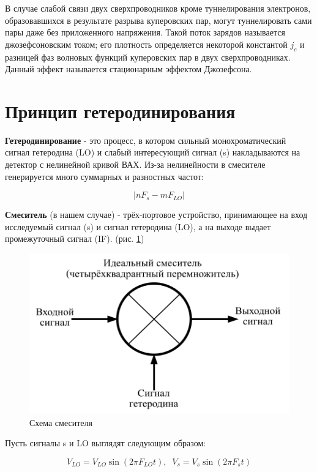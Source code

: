 \documentclass[12pt,a4paper]{article}
\begin{document}
В случае слабой связи двух сверхпроводников кроме туннелирования
электронов, образовавшихся в результате разрыва куперовских пар, могут
туннелировать сами пары даже без приложенного напряжения. Такой поток зарядов
называется джозефсоновским током; его плотность определяется некоторой
константой $j_c$ и разницей фаз волновых функций куперовских пар в двух
сверхпроводниках. Данный эффект называется стационарным эффектом Джозефсона.

\newpage

\section{Принцип гетеродинирования}

\textbf{Гетеродинирование} - это процесс, в котором сильный монохроматический сигнал гетеродина (LO) и слабый интересующий сигнал (s) накладываются на детектор с нелинейной кривой ВАХ. Из-за нелинейности в смесителе генерируется много суммарных и разностных частот:

\begin{equation}
    |nF_{s} - mF_{LO}|
\end{equation}

\textbf{Смеситель} (в нашем случае) - трёх-портовое устройство, принимающее на вход исследуемый сигнал (s) и сигнал гетеродина (LO), а на выходе выдает промежуточный сигнал (IF). (рис. \ref{mixer})

\begin{figure}[H]
    \centering
    \includegraphics[scale = 0.5]{mixer.png}
    \caption{Схема смесителя}
    \label{mixer}
\end{figure}

Пусть сигналы s и LO выглядят следующим образом:

\begin{equation}
    V_{LO} = V_{LO} \sin{(2 \pi F_{LO}t)}, \;\; V_s = V_s \sin{(2 \pi F_s t)}
    \label{eq:he-signals}
\end{equation}
\end{document}
